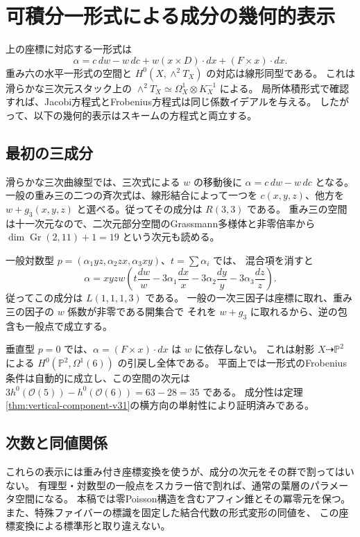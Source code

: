 \section{可積分一形式による成分の幾何的表示}
\label{sec:geometric-dictionary-v32}

上の座標に対応する一形式は
\[
 \alpha=c\,dw-w\,dc+w(x\times D)\cdot dx+(F\times x)\cdot dx.
\]
重み六の水平一形式の空間と $H^0(X,\wedge^2T_X)$ の対応は線形同型である。
これは滑らかな三次元スタック上の
$\wedge^2T_X\simeq\Omega_X^1\otimes K_X^{-1}$ による。
局所体積形式で確認すれば、Jacobi方程式とFrobenius方程式は同じ係数イデアルを与える。
したがって、以下の幾何的表示はスキームの方程式と両立する。

\subsection{最初の三成分}

滑らかな三次曲線型では、三次式による $w$ の移動後に
$\alpha=c\,dw-w\,dc$ となる。
一般の重み三の二つの斉次式は、線形結合によって一つを $c(x,y,z)$、他方を $w+g_3(x,y,z)$
と選べる。従ってその成分は $R(3,3)$ である。
重み三の空間は十一次元なので、二次元部分空間のGrassmann多様体と非零倍率から
$\dim\operatorname{Gr}(2,11)+1=19$ という次元も読める。

一般対数型 $p=(\alpha_1yz,\alpha_2zx,\alpha_3xy)$、$t=\sum\alpha_i$ では、
混合項を消すと
\[
 \alpha=xyzw\left(t\frac{dw}{w}-3\alpha_1\frac{dx}{x}
                   -3\alpha_2\frac{dy}{y}-3\alpha_3\frac{dz}{z}\right).
\]
従ってこの成分は $L(1,1,1,3)$ である。
一般の一次三因子は座標に取れ、重み三の因子の $w$ 係数が非零である開集合で
それを $w+g_3$ に取れるから、逆の包含も一般点で成立する。

垂直型 $p=0$ では、$\alpha=(F\times x)\cdot dx$ は $w$ に依存しない。
これは射影 $X\dashrightarrow\mathbb P^2$ による
$H^0(\mathbb P^2,\Omega^1(6))$ の引戻し全体である。
平面上では一形式のFrobenius条件は自動的に成立し、この空間の次元は
$3h^0(\mathcal O(5))-h^0(\mathcal O(6))=63-28=35$ である。
成分性は定理\ref{thm:vertical-component-v31}の横方向の単射性により証明済みである。

\subsection{次数と同値関係}

これらの表示には重み付き座標変換を使うが、成分の次元をその群で割ってはいない。
有理型・対数型の一般点をスカラー倍で割れば、通常の葉層のパラメータ空間になる。
本稿では零Poisson構造を含むアフィン錐とその冪零元を保つ。
また、特殊ファイバーの標識を固定した結合代数の形式変形の同値を、
この座標変換による標準形と取り違えない。
